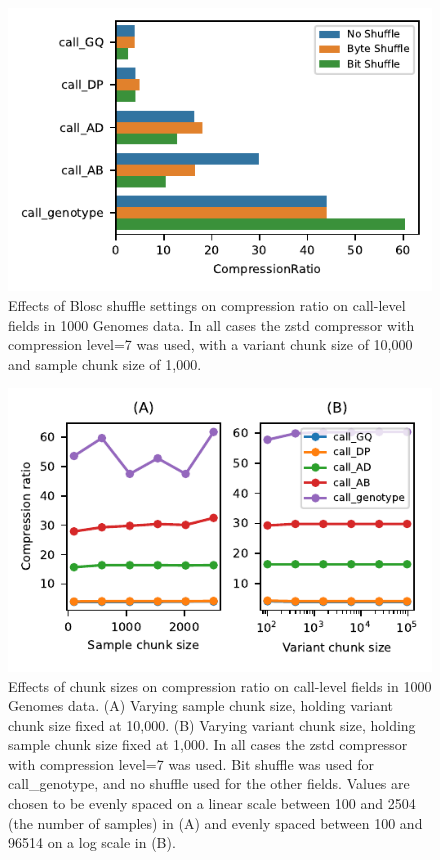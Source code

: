 \documentclass[a4paper,num-refs]{oup-contemporary}
\begin{document}
\begin{figure}[h]
\includegraphics{figures/compression-shuffle}
\caption{Effects of Blosc shuffle settings on compression ratio on call-level 
fields in 1000 Genomes data. 
In all cases the zstd compressor with compression level=7 was used, with a variant
chunk size of 10,000 and sample chunk size of 1,000.
\label{fig-compression-shuffle}}
\end{figure}

\begin{figure}[h]
\includegraphics{figures/compression-chunksize}
\caption{Effects of chunk sizes on compression ratio on call-level 
fields in 1000 Genomes data.
(A) Varying sample chunk size, holding variant chunk size fixed at 10,000.
(B) Varying variant chunk size, holding sample chunk size fixed at 1,000.
In all cases the zstd compressor with compression level=7 was used. Bit shuffle
was used for call\_genotype, and no shuffle used for the other fields.
Values are chosen to be evenly spaced on a linear scale 
between 100 and 2504 (the number of samples) in (A) and 
evenly spaced between 100 and 96514 on a log scale in (B). 
\label{fig-compression-chunksize}}
\end{figure}
\end{document}
